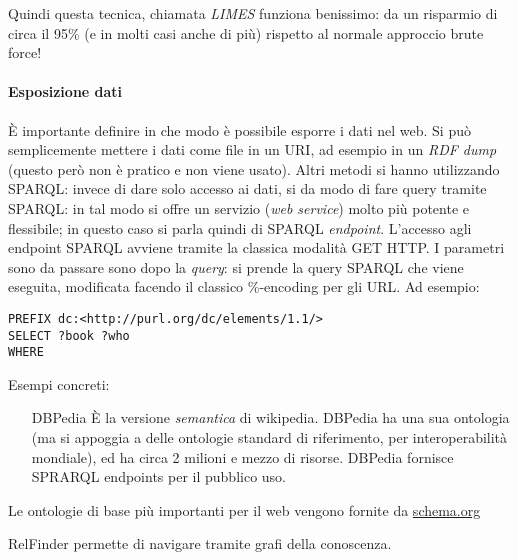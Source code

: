 Quindi questa tecnica, chiamata \textit{LIMES} funziona benissimo: da un risparmio di circa il 95\% (e in molti casi anche di pi\`u) rispetto al normale approccio brute force!

\paragraph*{Esposizione dati}\`E importante definire in che modo \`e possibile esporre i dati nel web. Si pu\`o semplicemente mettere i dati come file in un URI, ad esempio in un \textit{RDF dump} (questo per\`o non \`e pratico e non viene usato). Altri metodi si hanno utilizzando SPARQL: invece di dare solo accesso ai dati, si da modo di fare query tramite SPARQL: in tal modo si offre un servizio (\textit{web service}) molto pi\`u potente e flessibile; in questo caso si parla quindi di SPARQL \textit{endpoint}. L'accesso agli endpoint SPARQL avviene tramite la classica modalit\`a GET HTTP. I parametri sono da passare sono dopo la \textit{query}: si prende la query SPARQL che viene eseguita, modificata facendo il classico \%-encoding per gli URL.
Ad esempio:
\begin{verbatim}
PREFIX dc:<http://purl.org/dc/elements/1.1/>
SELECT ?book ?who
WHERE 
\end{verbatim}

Esempi concreti:
\begin{itemize}
\item[DBPedia] \`E la versione \textit{semantica} di wikipedia. DBPedia ha una sua ontologia (ma si appoggia a delle ontologie standard di riferimento, per interoperabilit\`a mondiale), ed ha circa 2 milioni e mezzo di risorse. DBPedia fornisce SPRARQL endpoints per il pubblico uso.
\end{itemize}

Le ontologie di base pi\`u importanti per il web vengono fornite da \url{schema.org}

RelFinder permette di navigare tramite grafi della conoscenza.

